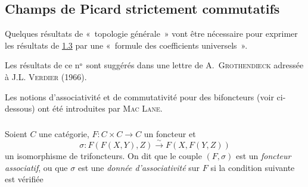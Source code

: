 \documentclass[10pt]{../fichiers-configuration-latex/smfart}
\begin{document}
\subsection{Champs de Picard strictement
  commutatifs}

Quelques résultats de « topologie générale » vont être nécessaire
pour exprimer les résultats de \hyperref[XVIII.subsec1.3]{1.3} par une « formule des
coefficients universels ».

Les résultats de ce nᵒ sont suggérés dans une lettre de
A.~\textsc{Grothendieck} adressée à J.L. \textsc{Verdier} (1966).

Les notions d'associativité et de commutativité pour des bifoncteurs
(voir ci-dessous) ont été introduites par \textsc{Mac Lane}.

\subsubsection{}
Soient $C$ une catégorie, $F:C\times C\rightarrow C$ un foncteur et
$$
\sigma:F(F(X,Y),Z)\xrightarrow{\sim} F(X,F(Y,Z))
$$
un isomorphisme de trifoncteurs. On dit que le couple $(F,\sigma)$ est
un \emph{foncteur associatif}, ou que $\sigma$ est une \emph{donnée
d'associativité} sur $F$ si la condition suivante est vérifiée
\end{document}

